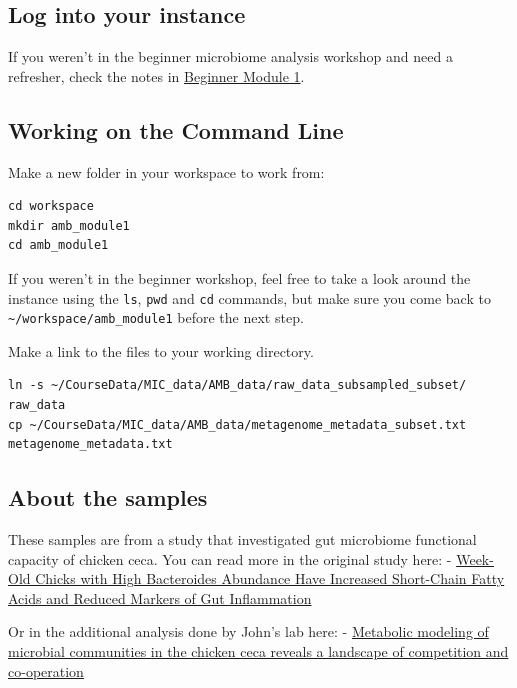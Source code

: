 \documentclass[
]{book}
\begin{document}
\subsection{Log into your instance}\label{log-into-your-instance}

If you weren't in the beginner microbiome analysis workshop and need a refresher, check the notes in \href{https://bioinformaticsdotca.github.io/BMB_2025/module-1.html\#log-into-your-aws-instance}{Beginner Module 1}.

\subsection{Working on the Command Line}\label{working-on-the-command-line}

Make a new folder in your workspace to work from:

\begin{verbatim}
cd workspace
mkdir amb_module1
cd amb_module1
\end{verbatim}

If you weren't in the beginner workshop, feel free to take a look around the instance using the \texttt{ls}, \texttt{pwd} and \texttt{cd} commands, but make sure you come back to \texttt{\textasciitilde{}/workspace/amb\_module1} before the next step.

Make a link to the files to your working directory.

\begin{verbatim}
ln -s ~/CourseData/MIC_data/AMB_data/raw_data_subsampled_subset/ raw_data
cp ~/CourseData/MIC_data/AMB_data/metagenome_metadata_subset.txt metagenome_metadata.txt
\end{verbatim}

\subsection{About the samples}\label{about-the-samples}

These samples are from a study that investigated gut microbiome functional capacity of chicken ceca. You can read more in the original study here:
- \href{https://journals.asm.org/doi/full/10.1128/spectrum.03616-22}{Week-Old Chicks with High Bacteroides Abundance Have Increased Short-Chain Fatty Acids and Reduced Markers of Gut Inflammation}

Or in the additional analysis done by John's lab here:
- \href{https://www.biorxiv.org/content/10.1101/2024.10.14.618310v1.full}{Metabolic modeling of microbial communities in the chicken ceca reveals a landscape of competition and co-operation}
\end{document}
